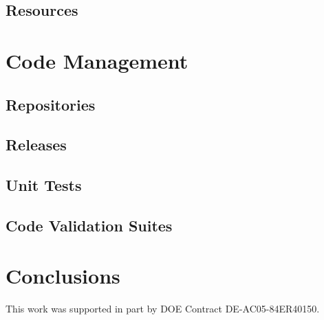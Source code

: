 \documentclass{elsart}
\begin{document}
\subsection{Resources}

\section{Code Management}

\subsection{Repositories}

\subsection{Releases}

\subsection{Unit Tests}

\subsection{Code Validation Suites}

\section{Conclusions}

\ack

This work was supported in part by DOE Contract DE-AC05-84ER40150.
\end{document}
